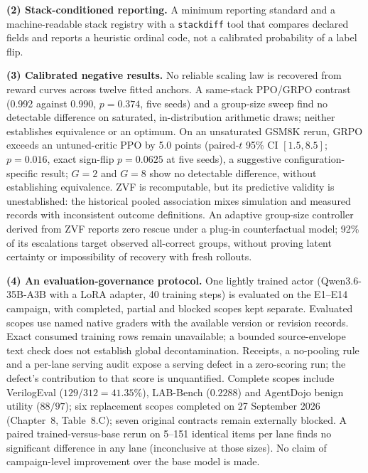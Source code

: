 \textbf{(2) Stack-conditioned reporting.} A minimum reporting standard and a
machine-readable stack registry with a \texttt{stackdiff} tool that compares
declared fields and reports a heuristic ordinal code, not a calibrated
probability of a label flip.

\textbf{(3) Calibrated negative results.} No reliable scaling law is recovered
from reward curves across twelve fitted anchors. A same-stack PPO/GRPO
contrast (0.992 against 0.990, $p = 0.374$, five seeds) and a group-size sweep
find no detectable difference on saturated, in-distribution arithmetic draws;
neither establishes equivalence or an optimum. On an unsaturated GSM8K rerun, GRPO exceeds an
untuned-critic PPO by 5.0 points (paired-$t$ 95\% CI $[1.5, 8.5]$;
$p=0.016$, exact sign-flip $p=0.0625$ at five seeds), a suggestive
configuration-specific result; $G = 2$ and $G = 8$ show no detectable
difference, without establishing equivalence. ZVF is recomputable, but its
predictive validity is unestablished: the historical pooled association mixes
simulation and measured records with inconsistent outcome definitions. An adaptive group-size controller
derived from ZVF reports zero rescue under a plug-in counterfactual model;
92\% of its escalations target observed all-correct groups, without proving
latent certainty or impossibility of recovery with fresh rollouts.

\textbf{(4) An evaluation-governance protocol.} One lightly trained actor
(Qwen3.6-35B-A3B with a LoRA adapter, 40 training steps) is evaluated on
the E1--E14 campaign, with completed, partial and blocked scopes kept separate.
Evaluated scopes use named native graders with the available version or revision
records. Exact consumed training rows remain unavailable; a bounded source-envelope
text check does not establish global decontamination. Receipts,
a no-pooling rule and a per-lane serving audit expose a serving defect in a
zero-scoring run; the defect's contribution to that score is unquantified.
Complete scopes include VerilogEval
($129/312 = 41.35\%$), LAB-Bench ($0.2288$) and AgentDojo benign utility
($88/97$); six replacement scopes completed on 27 September 2026
(Chapter~8, Table~8.C); seven original contracts remain externally blocked. A
paired trained-versus-base rerun on 5--151 identical items per lane finds no
significant difference in any lane (inconclusive at those sizes). No
claim of campaign-level improvement over the base model is made.


